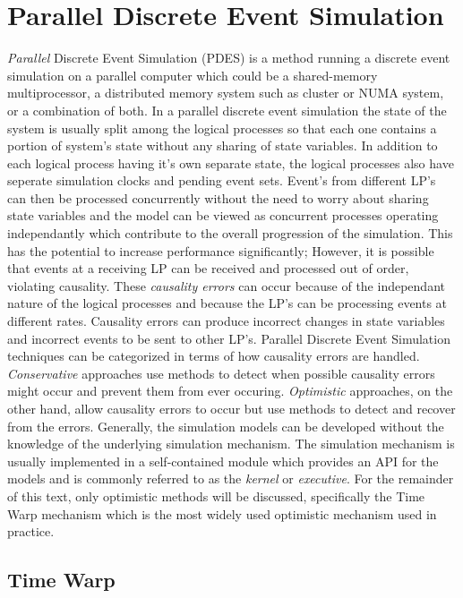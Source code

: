 \documentclass[11pt]{book}
\begin{document}
\section{Parallel Discrete Event Simulation}

\emph{Parallel} Discrete Event Simulation (PDES) is a method running a discrete event
simulation on a parallel computer which could be a shared-memory multiprocessor, a distributed
memory system such as cluster or NUMA system, or a combination of both. In a parallel
discrete event simulation the state of the system is usually split among the logical
processes so that each one contains a portion of system's state without any sharing of
state variables\cite{fujimoto-90}. In addition to each logical process having it's own
separate state, the logical processes also have seperate simulation clocks and pending
event sets. Event's from different LP's can then be processed concurrently without the
need to worry about sharing state variables and the model can be viewed as concurrent
processes operating independantly which contribute to the overall progression of the
simulation. This has the potential to increase performance significantly; However, it is
possible that events at a receiving LP can be received and processed out of order, violating
causality. These \emph{causality errors} can occur because of the independant nature of the
logical processes and because the LP's can be processing events at different rates.
Causality errors can produce incorrect changes in state variables and incorrect events to
be sent to other LP's. Parallel Discrete Event Simulation techniques can be categorized in
terms of how causality errors are handled. \emph{Conservative} approaches use methods to
detect when possible causality errors might occur and prevent them from ever occuring.
\emph{Optimistic} approaches, on the other hand, allow causality errors to occur but use
methods to detect and recover from the errors. Generally, the simulation models can be
developed without the knowledge of the underlying simulation mechanism. The simulation
mechanism is usually implemented in a self-contained module which provides an API for the
models and is commonly referred to as the \emph{kernel} or \emph{executive}. For the remainder
of this text, only optimistic methods will be discussed, specifically the Time Warp mechanism
which is the most widely used optimistic mechanism used in practice.

\subsection{Time Warp}
\end{document}

